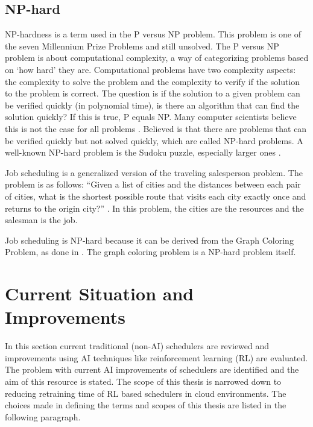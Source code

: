 \subsection{NP-hard}

NP-hardness is a term used in the P versus NP problem. This problem is one of
the seven Millennium Prize Problems \cite{carlson2006} and still unsolved. The
P versus NP problem is about computational complexity, a way of categorizing
problems based on `how hard' they are. Computational problems have two
complexity aspects: the complexity to solve the problem and the complexity to
verify if the solution to the problem is correct. The question is if the
solution to a given problem can be verified quickly (in polynomial time), is
there an algorithm that can find the solution quickly? If this is true, P
equals NP. Many computer scientists believe this is not the case for all
problems \cite{rosenberger2012}. Believed is that there are problems that can
be verified quickly but not solved quickly, which are called NP-hard problems.
A well-known NP-hard problem is the Sudoku puzzle, especially larger ones
\cite{yato2003}.

Job scheduling is a generalized version of the traveling salesperson problem.
The problem is as follows: ``Given a list of cities and the distances between
each pair of cities, what is the shortest possible route that visits each city
exactly once and returns to the origin city?'' \cite{flood1956}. In this
problem, the cities are the resources and the salesman is the job.

Job scheduling is NP-hard because it can be derived from the Graph Coloring
Problem, as done in . The graph coloring problem is a
NP-hard problem itself.


\section{Current Situation and Improvements}\label{sec:situ}

In this section current traditional (non-AI) schedulers are reviewed and
improvements using AI techniques like reinforcement learning (RL) are
evaluated. The problem with current AI improvements of schedulers are
identified and the aim of this resource is stated. The scope of this thesis is
narrowed down to reducing retraining time of RL based schedulers in cloud
environments. The choices made in defining the terms and scopes of this thesis
are listed in the following paragraph.

